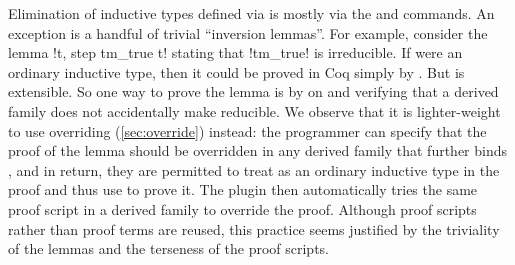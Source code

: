 Elimination of inductive types defined via  is
mostly via the  and  commands.
An exception is a handful of trivial ``inversion lemmas''.
For example, consider the lemma \lsti!\forall t, \neg step tm_true t!
stating that \lsti!tm_true! is irreducible.
If  were an ordinary inductive type, then it could be proved in Coq
simply by .
But  is extensible. So one way to prove the lemma is
by  on  and verifying that
a derived family does not accidentally make  reducible.
%
We observe that it is lighter-weight to use overriding (\cref{sec:override}) instead:
the programmer can specify that the proof of the lemma should be overridden
in any derived family that further binds ,
and in return, they are permitted to treat  as an ordinary
inductive type in the proof and thus use  to prove it.
The plugin then automatically tries the same proof script in a derived
family to override the proof. Although proof scripts rather
than proof terms are reused, this practice seems justified
by the triviality of the lemmas and the terseness of the proof scripts.





